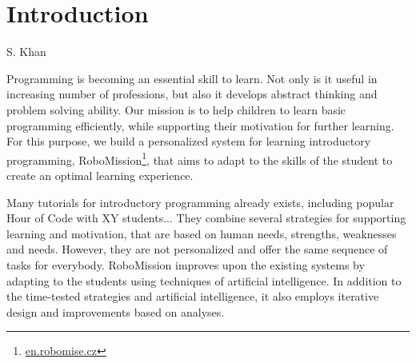 \chapter{Introduction}
\label{chap:introduction}


{S. Khan}

Programming is becoming an essential skill to learn.
Not only is it useful in increasing number of professions,
but also it develops abstract thinking and problem solving ability. %
Our mission is to help children to learn basic programming efficiently,
while supporting their motivation for further learning.
For this purpose, we build a personalized system for learning introductory
programming, RoboMission\footnote{\url{en.robomise.cz}},
that aims to adapt to the skills of the student
to create an optimal learning experience.

Many tutorials for introductory programming already exists,
including popular Hour of Code \cite{hour-of-code} with XY students...
They combine several strategies for supporting learning and motivation,
that are based on human needs, strengths, weaknesses and needs.
However, they are not personalized and offer the same sequence of tasks
for everybody.
RoboMission improves upon the existing systems by adapting to the
students using techniques of artificial intelligence.
In addition to the time-tested strategies and artificial intelligence,
it also employs iterative design and improvements based on analyses.

